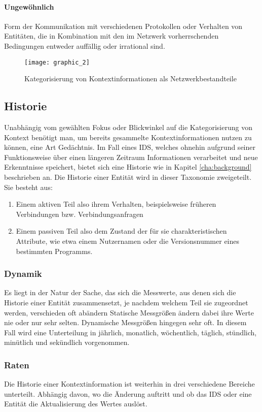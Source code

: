 \paragraph{Ungewöhnlich}
Form der Kommunikation mit verschiedenen Protokollen oder Verhalten von Entitäten, die in Kombination mit den im Netzwerk vorherrschenden Bedingungen entweder auffällig oder irrational sind.
\begin{figure}[H]
\centering
\texttt{[image: graphic\_2]}
\caption{Kategorisierung von Kontextinformationen als Netzwerkbestandteile}
\label{Tax_2} 
\end{figure}
\subsection{Historie}
Unabhängig vom gewählten Fokus oder Blickwinkel auf die Kategorisierung von Kontext benötigt man, um bereits gesammelte Kontextinformationen nutzen zu können, eine Art Gedächtnis. Im Fall eines IDS, welches ohnehin aufgrund seiner Funktionsweise über einen längeren Zeitraum Informationen verarbeitet und neue Erkenntnisse speichert, bietet sich eine Historie wie in Kapitel \ref{cha:background} beschrieben an.
Die Historie einer Entität wird in dieser Taxonomie zweigeteilt. Sie besteht aus:
\begin{enumerate}
\item{Einem aktiven Teil also ihrem Verhalten, beispielsweise früheren Verbindungen bzw. Verbindungsanfragen}
\item{Einem passiven Teil also dem Zustand der für sie charakteristischen Attribute, wie etwa einem Nutzernamen oder die Versionsnummer eines bestimmten Programms. }
\end{enumerate}
\subsubsection{Dynamik}
Es liegt in der Natur der Sache, das sich die Messwerte, aus denen sich die Historie einer Entität zusammensetzt, je nachdem welchem Teil sie zugeordnet werden, verschieden oft abändern
Statische Messgrößen ändern dabei ihre Werte nie oder nur sehr selten. Dynamische Messgrößen hingegen sehr oft. In diesem Fall wird eine Unterteilung in jährlich, monatlich, wöchentlich, täglich, stündlich, minütlich und sekündlich vorgenommen. 
\subsubsection{Raten}
Die Historie einer Kontextinformation ist weiterhin in drei verschiedene Bereiche unterteilt. Abhängig davon, wo die Änderung auftritt und ob das IDS oder eine Entität die Aktualisierung des Wertes auslöst.
